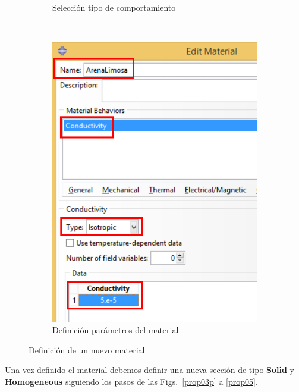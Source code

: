 \begin{figure}[!h]
\begin{subfigure}[!h]{0.36\textwidth}
      \caption{Selección tipo de comportamiento}
      \label{prop02}
    \end{subfigure}%
    ~
    \begin{subfigure}[!h]{0.36\textwidth}
      \includegraphics[width=\textwidth]{./body/images/prop03.pdf}
      \caption{Definición parámetros del material}
      \label{prop03}
    \end{subfigure}%
    \caption{Definición de un nuevo material}
  \end{figure}

  Una vez definido el material debemos definir una nueva sección de
  tipo \textbf{Solid} y \textbf{Homogeneous} siguiendo los pasos de
  las Figs.~\ref{prop03p} a \ref{prop05}.

